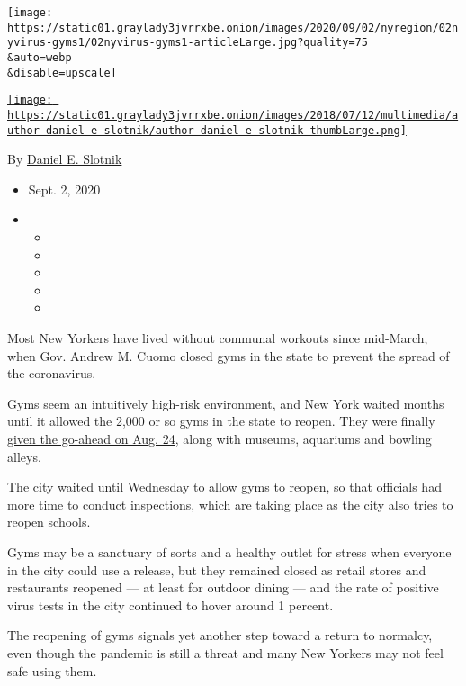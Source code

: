 \texttt{[image: https://static01.graylady3jvrrxbe.onion/images/2020/09/02/nyregion/02nyvirus-gyms1/02nyvirus-gyms1-articleLarge.jpg?quality=75\\\&auto=webp\\\&disable=upscale]}

\href{https://www.nytimes3xbfgragh.onion/by/daniel-e-slotnik}{\texttt{[image: https://static01.graylady3jvrrxbe.onion/images/2018/07/12/multimedia/author-daniel-e-slotnik/author-daniel-e-slotnik-thumbLarge.png]}}

By \href{https://www.nytimes3xbfgragh.onion/by/daniel-e-slotnik}{Daniel
E. Slotnik}

\begin{itemize}
\item
  Sept. 2, 2020
\item
  \begin{itemize}
  \item
  \item
  \item
  \item
  \item
  \end{itemize}
\end{itemize}

Most New Yorkers have lived without communal workouts since mid-March,
when Gov. Andrew M. Cuomo closed gyms in the state to prevent the spread
of the coronavirus.

Gyms seem an intuitively high-risk environment, and New York waited
months until it allowed the 2,000 or so gyms in the state to reopen.
They were finally
\href{https://www.nytimes3xbfgragh.onion/2020/08/17/nyregion/nyc-gyms-reopening.html}{given
the go-ahead on Aug. 24}, along with museums, aquariums and bowling
alleys.

The city waited until Wednesday to allow gyms to reopen, so that
officials had more time to conduct inspections, which are taking place
as the city also tries to
\href{https://www.nytimes3xbfgragh.onion/2020/09/01/nyregion/schools-open-coronavirus-nyc.html}{reopen
schools}.

Gyms may be a sanctuary of sorts and a healthy outlet for stress when
everyone in the city could use a release, but they remained closed as
retail stores and restaurants reopened --- at least for outdoor dining
--- and the rate of positive virus tests in the city continued to hover
around 1 percent.

The reopening of gyms signals yet another step toward a return to
normalcy, even though the pandemic is still a threat and many New
Yorkers may not feel safe using them.

